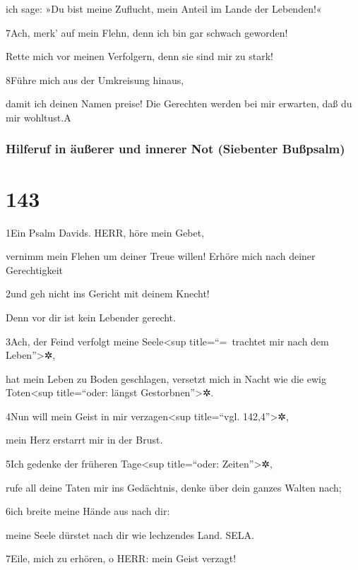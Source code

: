 ich sage: »Du bist meine Zuflucht, mein Anteil im Lande der Lebenden!«

7Ach, merk' auf mein Flehn, denn ich bin gar schwach geworden!

Rette mich vor meinen Verfolgern, denn sie sind mir zu stark!

8Führe mich aus der Umkreisung hinaus,

damit ich deinen Namen preise! Die Gerechten werden bei mir erwarten,
daß du mir wohltust.{A}

\hypertarget{hilferuf-in-uxe4uuxdferer-und-innerer-not-siebenter-buuxdfpsalm}{%
\subsubsection{Hilferuf in äußerer und innerer Not (Siebenter
Bußpsalm)}\label{hilferuf-in-uxe4uuxdferer-und-innerer-not-siebenter-buuxdfpsalm}}

\hypertarget{section-142}{%
\section{143}\label{section-142}}

1Ein Psalm Davids. HERR, höre mein Gebet,

vernimm mein Flehen um deiner Treue willen! Erhöre mich nach deiner
Gerechtigkeit

2und geh nicht ins Gericht mit deinem Knecht!

Denn vor dir ist kein Lebender gerecht.

3Ach, der Feind verfolgt meine Seele\textless sup title=``=~trachtet mir
nach dem Leben''\textgreater✲,

hat mein Leben zu Boden geschlagen, versetzt mich in Nacht wie die ewig
Toten\textless sup title=``oder: längst Gestorbnen''\textgreater✲.

4Nun will mein Geist in mir verzagen\textless sup title=``vgl.
142,4''\textgreater✲,

mein Herz erstarrt mir in der Brust.

5Ich gedenke der früheren Tage\textless sup title=``oder:
Zeiten''\textgreater✲,

rufe all deine Taten mir ins Gedächtnis, denke über dein ganzes Walten
nach;

6ich breite meine Hände aus nach dir:

meine Seele dürstet nach dir wie lechzendes Land. SELA.

7Eile, mich zu erhören, o HERR: mein Geist verzagt!

